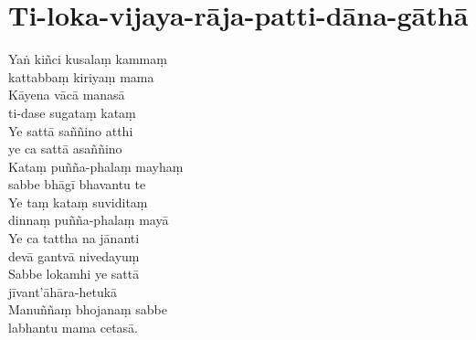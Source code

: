 
\clearpage

\section{Ti-loka-vijaya-rāja-patti-dāna-gāthā}


Yaṅ kiñci kusalaṃ kammaṃ\\
\vin kattabbaṃ kiriyaṃ mama\\
Kāyena vācā manasā\\
\vin ti-dase sugataṃ kataṃ\\
Ye sattā saññino atthi\\
\vin ye ca sattā asaññino\\
Kataṃ puñña-phalaṃ mayhaṃ\\
\vin sabbe bhāgī bhavantu te\\
Ye taṃ kataṃ suviditaṃ\\
\vin dinnaṃ puñña-phalaṃ mayā\\
Ye ca tattha na jānanti\\
\vin devā gantvā nivedayuṃ\\
Sabbe lokamhi ye sattā\\
\vin jīvant'āhāra-hetukā\\
Manuññaṃ bhojanaṃ sabbe\\
\vin labhantu mama cetasā.



